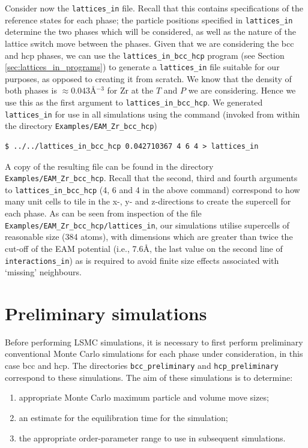 \documentclass{report}
\begin{document}
Consider now the \texttt{lattices\_in} file. Recall that this contains specifications of the reference states for each phase;
the particle positions specified in \texttt{lattices\_in} determine the two phases which will be considered, as well as the nature of
the lattice switch move between the phases.
Given that we are considering the bcc and hcp phases, we can use the \texttt{lattices\_in\_bcc\_hcp} program (see Section 
\ref{sec:lattices_in_programs}) to generate a \texttt{lattices\_in} file suitable for our purposes, as opposed to creating it from scratch. 
We know that the density of both phases is $\approx 0.043$\AA$^{-3}$  for Zr at the $T$ and $P$ we are considering. Hence we use this as
the first argument to \texttt{lattices\_in\_bcc\_hcp}. We generated \texttt{lattices\_in} for use in all simulations using the command 
(invoked from within the directory \texttt{Examples/EAM\_Zr\_bcc\_hcp})
\begin{verbatim}
$ ../../lattices_in_bcc_hcp 0.042710367 4 6 4 > lattices_in
\end{verbatim}
A copy of the resulting file can be found in the directory \texttt{Examples/EAM\_Zr\_bcc\_hcp}.
Recall that the second, third and fourth arguments to \texttt{lattices\_in\_bcc\_hcp} (4, 6 and 4 in the above command) correspond 
to how many unit cells to tile in the x-, y- and z-directions to create the supercell for each phase. As can be seen from inspection of the 
file \texttt{Examples/EAM\_Zr\_bcc\_hcp/lattices\_in}, our simulations utilise supercells of reasonable size (384 atoms), 
with dimensions which are greater than twice the cut-off of the EAM potential (i.e., 7.6\AA, the last value on the second
line of \texttt{interactions\_in}) as is required to avoid finite size effects associated with `missing' neighbours.

\section{Preliminary simulations}
Before performing LSMC simulations, it is necessary to first perform preliminary conventional Monte Carlo simulations for each phase 
under consideration, in this case bcc and hcp. The directories \texttt{bcc\_preliminary} and \texttt{hcp\_preliminary} correspond to 
these simulations. The aim of these simulations is to determine:
\begin{enumerate}
\item appropriate Monte Carlo maximum particle and volume move sizes;
\item an estimate for the equilibration time for the simulation;
\item the appropriate order-parameter range to use in subsequent simulations.
\end{enumerate}
\end{document}
